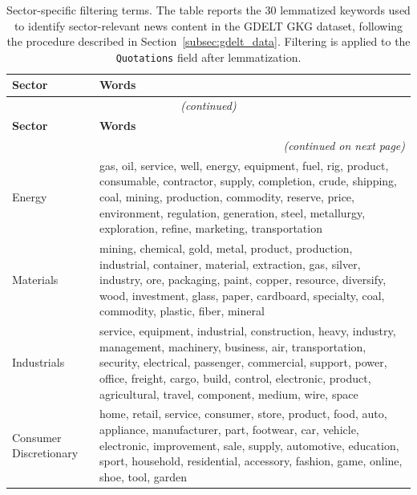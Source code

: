 \begin{longtable}{@{}p{2.5cm} | p{12.6cm}@{}}
\caption{Sector-specific filtering terms. The table reports the 30 lemmatized keywords used to identify sector-relevant news content in the GDELT GKG dataset, following the procedure described in Section~\ref{subsec:gdelt_data}. Filtering is applied to the \texttt{Quotations} field after lemmatization.}
\label{tab:per_sector_filter_words} \\

\toprule
\textbf{Sector} & \textbf{Words} \\
\midrule
\endfirsthead

\multicolumn{2}{c}{\footnotesize\textit{(continued)}} \\
\toprule
\textbf{Sector} & \textbf{Words} \\
\midrule
\endhead

\midrule
\multicolumn{2}{r}{\footnotesize\textit{(continued on next page)}} \\
\endfoot

\bottomrule
\endlastfoot

Energy
& gas, oil, service, well, energy, equipment, fuel, rig, product, consumable, contractor, supply, completion, crude, shipping, coal, mining, production, commodity, reserve, price, environment, regulation, generation, steel, metallurgy, exploration, refine, marketing, transportation \\

Materials
& mining, chemical, gold, metal, product, production, industrial, container, material, extraction, gas, silver, industry, ore, packaging, paint, copper, resource, diversify, wood, investment, glass, paper, cardboard, specialty, coal, commodity, plastic, fiber, mineral \\

Industrials
& service, equipment, industrial, construction, heavy, industry, management, machinery, business, air, transportation, security, electrical, passenger, commercial, support, power, office, freight, cargo, build, control, electronic, product, agricultural, travel, component, medium, wire, space \\

Consumer $\ $ Discretionary
& home, retail, service, consumer, store, product, food, auto, appliance, manufacturer, part, footwear, car, vehicle, electronic, improvement, sale, supply, automotive, education, sport, household, residential, accessory, fashion, game, online, shoe, tool, garden \\


\end{longtable}

